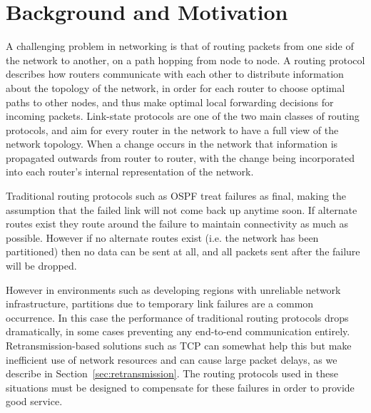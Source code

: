 \documentclass[withindex,glossary,openany]{cam-thesis}
\begin{document}
\section{Background and Motivation}

A challenging problem in networking is that of routing packets from one side of the network to another, on a path hopping from node to node. A routing protocol describes how routers communicate with each other to distribute information about the topology of the network, in order for each router to choose optimal paths to other nodes, and thus make optimal local forwarding decisions for incoming packets. Link-state protocols are one of the two main classes of routing protocols, and aim for every router in the network to have a full view of the network topology. When a change occurs in the network that information is propagated outwards from router to router, with the change being incorporated into each router's internal representation of the network.

Traditional routing protocols such as OSPF treat failures as final, making the assumption that the failed link will not come back up anytime soon. If alternate routes exist they route around the failure to maintain connectivity as much as possible. However if no alternate routes exist (i.e. the network has been partitioned) then no data can be sent at all, and all packets sent after the failure will be dropped.



However in environments such as developing regions with unreliable network infrastructure, partitions due to temporary link failures are a common occurrence. In this case the performance of traditional routing protocols drops dramatically, in some cases preventing any end-to-end communication entirely. Retransmission-based solutions such as TCP can somewhat help this but make inefficient use of network resources and can cause large packet delays, as we describe in Section~\ref{sec:retransmission}. The routing protocols used in these situations must be designed to compensate for these failures in order to provide good service.

\end{document}
